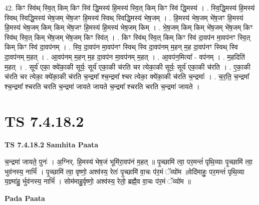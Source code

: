 \documentclass[17pt]{extarticle}
\begin{document}
42. किꣳ स्वि॑थ् स्वि॒त् किम् किꣳ स्वि॑ द्धि॒मस्य॑ हि॒मस्य॑ स्वि॒त् किम् किꣳ स्वि॑ द्धि॒मस्य॑ । . स्वि॒द्धि॒मस्य॑ हि॒मस्य॑ स्विथ् स्विद्धि॒मस्य॑ भेष॒जम् भे॑ष॒जꣳ हि॒मस्य॑ स्विथ् स्विद्धि॒मस्य॑ भेष॒जम् । . हि॒मस्य॑ भेष॒जम् भे॑ष॒जꣳ हि॒मस्य॑ हि॒मस्य॑ भेष॒जम् किम् किम् भे॑ष॒जꣳ हि॒मस्य॑ हि॒मस्य॑ भेष॒जम् किम् । . भे॒ष॒जम् किम् किम् भे॑ष॒जम् भे॑ष॒जम् किꣳ स्वि॑थ् स्वि॒त् किम् भे॑ष॒जम् भे॑ष॒जम् किꣳ स्वि॑त् । . किꣳ स्वि॑थ् स्वि॒त् किम् किꣳ स्वि॑ दा॒वप॑न मा॒वप॑नꣳ स्वि॒त् किम् किꣳ स्वि॑ दा॒वप॑नम् । . स्वि॒ दा॒वप॑न मा॒वप॑नꣳ स्विथ् स्वि दा॒वप॑नम् म॒हन् म॒ह दा॒वप॑नꣳ स्विथ् स्वि दा॒वप॑नम् म॒हत् । . आ॒वप॑नम् म॒हन् म॒ह दा॒वप॑न मा॒वप॑नम् म॒हत् । . आ॒वप॑न॒मित्या᳚ - वप॑नम् । . म॒हदिति॑ म॒हत् । . सूर्य॑ एका॒ क्ये॑का॒की सूर्यः॒ सूर्य॑ एका॒की च॑रति चर त्येका॒की सूर्यः॒ सूर्य॑ एका॒की च॑रति । . ए॒का॒की च॑रति चर त्येका॒ क्ये॑का॒की च॑रति च॒न्द्रमा᳚ श्च॒न्द्रमा᳚ श्चर त्येका॒ क्ये॑का॒की च॑रति च॒न्द्रमाः᳚ । . च॒र॒ति॒ च॒न्द्रमा᳚ श्च॒न्द्रमा᳚ श्चरति चरति च॒न्द्रमा॑ जायते जायते च॒न्द्रमा᳚ श्चरति चरति च॒न्द्रमा॑ जायते । \newline
\pagebreak
{}

\section{ TS 7.4.18.2 }

\textbf{TS 7.4.18.2 } \newline
\textbf{Samhita Paata} \newline

च॒न्द्रमा॑ जायते॒ पुनः॑ । अ॒ग्निर्. हि॒मस्य॑ भेष॒जं भूमि॑रा॒वप॑नं म॒हत् ॥ पृ॒च्छामि॑ त्वा॒ पर॒मन्तं॑ पृथि॒व्याः पृ॒च्छामि॑ त्वा॒ भुव॑नस्य॒ नाभिं᳚ । पृ॒च्छामि॑ त्वा॒ वृष्णो॒ अश्व॑स्य॒ रेतः॑ पृ॒च्छामि॑ वा॒चः प॑र॒मं ॅव्यो॑म ॥वेदि॑माहुः॒ पर॒मन्तं॑ पृथि॒व्या य॒ज्ञ्मा॑हु॒ र्भुव॑नस्य॒ नाभिं᳚ । सोम॑माहु॒र्वृष्णो॒ अश्व॑स्य॒ रेतो॒ ब्रह्मै॒व वा॒चः प॑र॒मं ॅव्यो॑म ॥ \newline

\textbf{Pada Paata} \newline
\end{document}
